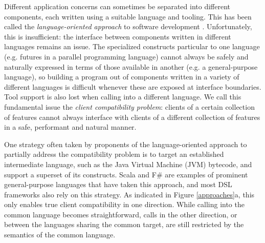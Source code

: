 Different application concerns can sometimes be separated into different components, each written using a suitable language and tooling. This has been called the \emph{language-oriented approach} to software development \cite{journals/stp/Ward94}. Unfortunately, this is insufficient: the interface between components written in different languages remains an issue. The specialized constructs particular to one language (e.g. futures in a parallel programming language) cannot always be safely and naturally expressed in terms of those available in another (e.g. a general-purpose language), so building a program out of components written in a variety of different languages is difficult whenever these are exposed at interface boundaries. Tool support is also lost when calling into a different language. We call this fundamental issue the \emph{client compatibility problem}: clients of a certain collection of features cannot always interface with clients of a different collection of features in a safe, performant and natural manner.

One strategy often taken by proponents of the language-oriented approach to partially address the compatibility problem is to  target an established intermediate language, such as the Java Virtual Machine (JVM) bytecode, and support a superset of its constructs. Scala \cite{200464/IC} and F\# \cite{pickering2007foundations} are examples of prominent general-purpose languages that have taken this approach, and most DSL frameworks also rely on this strategy. As indicated in Figure \ref{approaches}a, this only enables true client compatibility in one direction. While calling into the common language becomes straightforward, calls in the other direction, or between the languages sharing the common target, are still restricted by the semantics of the common language. 

